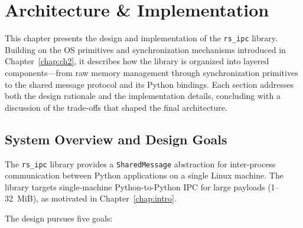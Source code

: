 \chapter{Architecture \& Implementation}
\label{chap:ch4}

This chapter presents the design and implementation of the \texttt{rs\_ipc} library. Building on the OS primitives and synchronization mechanisms introduced in Chapter~\ref{chap:ch2}, it describes how the library is organized into layered components---from raw memory management through synchronization primitives to the shared message protocol and its Python bindings. Each section addresses both the design rationale and the implementation details, concluding with a discussion of the trade-offs that shaped the final architecture.



\section{System Overview and Design Goals}
\label{sec:arch_overview}

The \texttt{rs\_ipc} library provides a \texttt{SharedMessage} abstraction for inter-process communication between Python applications on a single Linux machine. The library targets single-machine Python-to-Python IPC for large payloads (1--32~MiB), as motivated in Chapter~\ref{chap:intro}.

The design pursues five goals:

